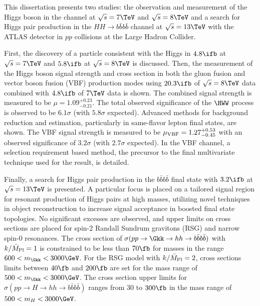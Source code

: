 This dissertation presents two studies: the observation and measurement of the Higgs boson in the \HWWfull channel at $\sqrt{s} = 7 \TeV$ and $\sqrt{s} = 8 \TeV$ and a search for Higgs pair production in the $HH\to b\bar{b}b\bar{b}$ channel at $\sqrt{s} = 13 \TeV$ with the ATLAS detector in $pp$ collisions at the Large Hadron Collider. 

First, the discovery of a particle consistent with the Higgs in $4.8\ifb$ at $\sqrt{s} = 7 \TeV$ and $5.8 \ifb$ at $\sqrt{s} = 8 \TeV$ is discussed. Then, the measurement of the Higgs boson signal strength and cross section in both the gluon fusion and vector boson fusion (VBF) production modes using $20.3\ifb$ of $\sqrt{s} = 8 \TeV$ data combined with $4.8\ifb$ of $7 \TeV$ data is shown. The combined signal strength is measured to be $\mu = 1.09^{+0.23}_{-0.21}$. The total observed significance of the $\HWW$ process is observed to be $6.1\sigma$ (with $5.8 \sigma$ expected). Advanced methods for background reduction and estimation, particularly in same-flavor lepton final states, are shown. The VBF signal strength is measured to be $\mu_{\rm VBF} = 1.27^{+0.53}_{-0.45}$ with an observed significance of $3.2\sigma$ (with $2.7 \sigma$ expected).  In the VBF channel, a selection requirement based method, the precursor to the final multivariate technique used for the result, is detailed. 

Finally, a search for Higgs pair production in the $b\bar{b}b\bar{b}$ final state with $3.2\ifb$ at $\sqrt{s} = 13\TeV$ is presented. A particular focus is placed on a tailored signal region for resonant production of Higgs pairs at high masses, utilizing novel techniques in object reconstruction to increase signal acceptance in boosted final state topologies. No significant excesses are observed, and upper limits on cross sections are placed for spin-2 Randall Sundrum gravitons (RSG) and narrow spin-0 resonances. The cross section of $\sigma(pp \to \Gkk \to hh \to b\bar{b}b\bar{b})$ with $k/\bar{M}_{\rm Pl}=1$ is constrained to be less than $70 \fb$ for masses in the range $600 < m_{\Gkk} < 3000 \GeV$. For the RSG model with $k/\bar{M}_{\rm Pl}=2$, cross sections limits between $40\fb$ and $200 \fb$ are set for the mass range of $500 < m_{\Gkk} < 3000 \GeV$. The cross section upper limits for $\sigma(pp \to H \to hh \to b\bar{b}b\bar{b})$ ranges from $30$ to $300 \fb$ in the mass range of $500 < m_{H} < 3000 \GeV$. 